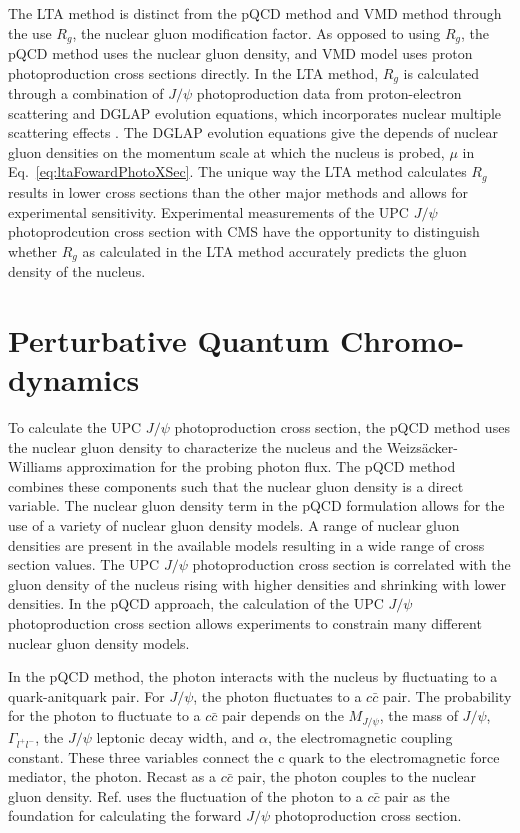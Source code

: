    The LTA method is distinct from the pQCD method and VMD method through the 
     use $R_{g}$, the nuclear gluon modification factor. 
   As opposed to using $R_{g}$, the pQCD method uses the nuclear gluon 
     density, and VMD model uses proton photoproduction cross sections 
     directly. 
   In the LTA method, $R_{g}$ is calculated through a combination of $J/\psi$ 
     photoproduction data from proton-electron scattering and DGLAP evolution 
     equations, which incorporates nuclear multiple scattering effects 
     \cite{lta2011.09}. 
   The DGLAP evolution equations give the depends of nuclear gluon densities on
     the momentum scale at which the nucleus is probed, $\mu$ in 
     Eq.~\ref{eq:ltaFowardPhotoXSec}. 
   The unique way the LTA method calculates $R_{g}$ results in lower cross 
     sections than the other major methods and allows for experimental
     sensitivity. 
   Experimental measurements of the UPC $J/\psi$ photoprodcution cross section 
     with CMS have the opportunity to distinguish whether $R_{g}$ as calculated 
     in the LTA method accurately predicts the gluon density of the nucleus. 
  
 
  \section{Perturbative Quantum Chromo-dynamics}
    To calculate the UPC $J/\psi$ photoproduction cross section, the pQCD 
      method uses the nuclear gluon density to characterize the nucleus and 
      the Weizs\"{a}cker-Williams approximation for the probing photon flux. 
    The pQCD method combines these components such that the nuclear gluon 
      density is a direct variable.
    The nuclear gluon density term in the pQCD formulation allows for 
      the use of a variety of nuclear gluon density models.
    A range of nuclear gluon densities are present in the available models
      resulting in a wide range of cross section values. 
    The UPC $J/\psi$ photoproduction cross section is correlated with the gluon
      density of the nucleus rising with higher densities and shrinking with 
      lower densities. 
    In the pQCD approach, the calculation of the UPC $J/\psi$ photoproduction 
      cross section allows experiments to constrain many different nuclear 
      gluon density models. 
    
    In the pQCD method, the photon interacts with the nucleus by fluctuating to 
      a quark-anitquark pair.
    For $J/\psi$, the photon fluctuates to a $c\bar{c}$ pair. 
    The probability for the photon to fluctuate to a $c\bar{c}$ pair
      depends on the $M_{J/\psi}$, the mass of $J/\psi$, $\Gamma_{l^{+}l^{-}}$, 
      the $J/\psi$ leptonic decay width, and $\alpha$, the electromagnetic 
      coupling constant.
    These three variables connect the c quark to the electromagnetic force 
      mediator, the photon. 
    Recast as a $c\bar{c}$ pair, the photon couples to the nuclear gluon 
      density.
    Ref. \cite{pQCD2011.08} uses the fluctuation of the photon to a $c\bar{c}$ 
      pair as the foundation for calculating the forward $J/\psi$ 
      photoproduction cross section. 

